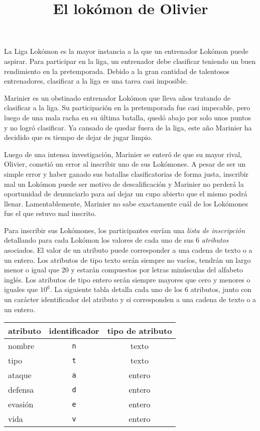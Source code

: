 \documentclass{oci}
\title{El lokómon de Olivier}
\begin{document}
\begin{problemDescription}
La Liga Lokómon es la mayor instancia a la que un entrenador Lokómon puede aspirar.
Para participar en la liga, un entrenador debe clasificar teniendo un buen
rendimiento en la pretemporada.
Debido a la gran cantidad de talentosos entrenadores, clasificar a la liga
es una tarea casi imposible.

Marinier es un obstinado entrenador Lokómon que lleva años tratando de clasificar a la liga.
Su participación en la pretemporada fue casi impecable, pero luego de una mala racha
en su última batalla, quedó abajo por solo unos puntos y no logró clasificar.
Ya cansado de quedar fuera de la liga, este año Marinier ha decidido que es tiempo
de dejar de jugar limpio.

Luego de una intensa investigación, Marinier se enteró de que su mayor rival, Olivier, cometió
un error al inscribir uno de sus Lokómones.
A pesar de ser un simple error y haber ganado sus batallas clasificatorias de
forma justa, inscribir mal un Lokómon puede ser motivo de descalificación y
Marinier no perderá la oportunidad de denunciarlo para así dejar un cupo abierto
que el mismo podrá llenar.
Lamentablemente, Marinier no sabe exactamente cuál de los Lokómones fue el que
estuvo mal inscrito.

Para inscribir sus Lokómones, los participantes envían una \emph{lista de inscripción}
detallando para cada Lokómon los valores de cada uno de sus 6 \emph{atributos} asociados.
El valor de un atributo puede corresponder a una cadena de texto o a un entero.
Los atributos de tipo texto serán siempre no vacíos, tendrán un largo menor o
igual que 20 y estarán compuestos por letras minúsculas del alfabeto inglés.
Los atributos de tipo entero serán siempre mayores que cero y menores o iguales
que $10^6$.
La siguiente tabla detalla cada uno de los 6 atributos, junto con un carácter identificador
del atributo y si corresponden a una cadena de texto o a un entero.
\begin{center}
\begin{tabular}{lcc}
	\toprule
	\textbf{atributo} & \textbf{identificador} & \textbf{tipo de atributo} \\
	\midrule
	{nombre } & \texttt{n} & texto \\
	{tipo   } & \texttt{t} & texto \\
	{ataque } & \texttt{a} & entero \\
	{defensa} & \texttt{d} & entero \\
	{evasión} & \texttt{e} & entero \\
	{vida   } & \texttt{v} & entero\\
	\bottomrule
\end{tabular}
\end{center}


\end{problemDescription}
\end{document}
